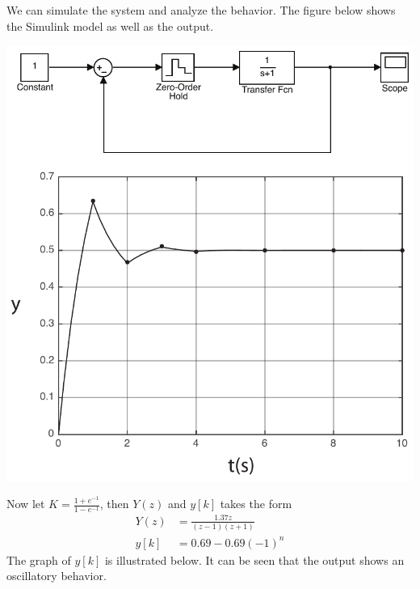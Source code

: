 \documentclass[twoside]{article}
\begin{document}
We can simulate the system and analyze the behavior. The figure below
shows the Simulink model as well as the output.
%
    \begin{center}
\begin{minipage}[h]{0.6\linewidth}
    \begin{center}
      \includegraphics[width=\textwidth]{stepsimulink}
    \end{center}
\end{minipage}
    \end{center}
%
Now let $K = \frac{1+e^{-1}}{1-e^{-1}}$, then $Y(z)$ and $y[k]$
takes the form
%
\begin{align*}
Y(z) &= \frac{1.37 z}{(z-1)(z + 1)} 
\\
y[k] &= 0.69 - 0.69 (-1)^n
\end{align*}
%
The graph of $y[k]$ is illustrated below. It can be seen that the
output shows an oscillatory behavior.
%
\end{document}
